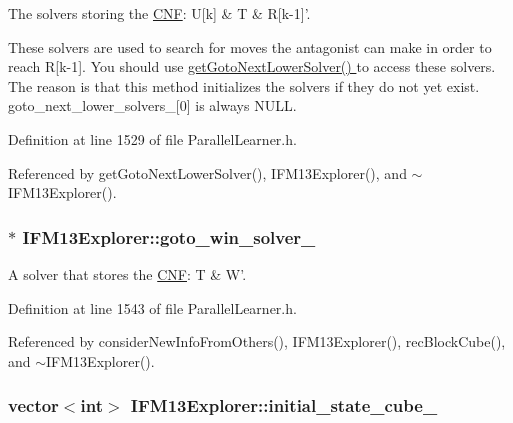 The solvers storing the \hyperlink{classCNF}{C\-N\-F}\-: U\mbox{[}k\mbox{]} \& T \& R\mbox{[}k-\/1\mbox{]}'. 

These solvers are used to search for moves the antagonist can make in order to reach R\mbox{[}k-\/1\mbox{]}. You should use \hyperlink{classIFM13Explorer_abdf350f2df8a77579df3da7ecb3de8e4}{get\-Goto\-Next\-Lower\-Solver() } to access these solvers. The reason is that this method initializes the solvers if they do not yet exist. goto\-\_\-next\-\_\-lower\-\_\-solvers\-\_\-\mbox{[}0\mbox{]} is always N\-U\-L\-L. 

Definition at line 1529 of file Parallel\-Learner.\-h.



Referenced by get\-Goto\-Next\-Lower\-Solver(), I\-F\-M13\-Explorer(), and $\sim$\-I\-F\-M13\-Explorer().

\hypertarget{classIFM13Explorer_acfe8f5c31b916cf5a6973069c522ef94}{
\subsubsection[{goto\-\_\-win\-\_\-solver\-\_\-}]{$\ast$ I\-F\-M13\-Explorer\-::goto\-\_\-win\-\_\-solver\-\_\-\hspace{0.3cm}{\ttfamily [protected]}}}\label{classIFM13Explorer_acfe8f5c31b916cf5a6973069c522ef94}


A solver that stores the \hyperlink{classCNF}{C\-N\-F}\-: T \& W'. 



Definition at line 1543 of file Parallel\-Learner.\-h.



Referenced by consider\-New\-Info\-From\-Others(), I\-F\-M13\-Explorer(), rec\-Block\-Cube(), and $\sim$\-I\-F\-M13\-Explorer().

\hypertarget{classIFM13Explorer_a8fed8ac3d0dc575f8803878f23df7815}{
\subsubsection[{initial\-\_\-state\-\_\-cube\-\_\-}]{\setlength{\rightskip}{0pt plus 5cm}vector$<$int$>$ I\-F\-M13\-Explorer\-::initial\-\_\-state\-\_\-cube\-\_\-\hspace{0.3cm}{\ttfamily [protected]}}}\label{classIFM13Explorer_a8fed8ac3d0dc575f8803878f23df7815}


